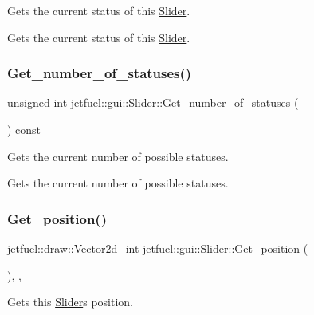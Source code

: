 Gets the current status of this \hyperlink{classjetfuel_1_1gui_1_1Slider}{Slider}. 

Gets the current status of this \hyperlink{classjetfuel_1_1gui_1_1Slider}{Slider}. \mbox{\label{classjetfuel_1_1gui_1_1Slider_a6cb71758be2833e86c9fc80c457b4b24}} 
\subsubsection{\texorpdfstring{Get\+\_\+number\+\_\+of\+\_\+statuses()}{Get\_number\_of\_statuses()}}
{\footnotesize\ttfamily unsigned int jetfuel\+::gui\+::\+Slider\+::\+Get\+\_\+number\+\_\+of\+\_\+statuses (\begin{DoxyParamCaption}{ }\end{DoxyParamCaption}) const\hspace{0.3cm}{\ttfamily [inline]}}



Gets the current number of possible statuses. 

Gets the current number of possible statuses. \mbox{\label{classjetfuel_1_1gui_1_1Slider_a2b177c832a42ad21ca1fa88496ef7551}} 
\subsubsection{\texorpdfstring{Get\+\_\+position()}{Get\_position()}}
{\footnotesize\ttfamily \hyperlink{classjetfuel_1_1draw_1_1Vector2d}{jetfuel\+::draw\+::\+Vector2d\+\_\+int} jetfuel\+::gui\+::\+Slider\+::\+Get\+\_\+position (\begin{DoxyParamCaption}{ }\end{DoxyParamCaption})\hspace{0.3cm}{\ttfamily [inline]}, {\ttfamily [override]}, {\ttfamily [virtual]}}



Gets this \hyperlink{classjetfuel_1_1gui_1_1Slider}{Slider}\textquotesingle{}s position. 

